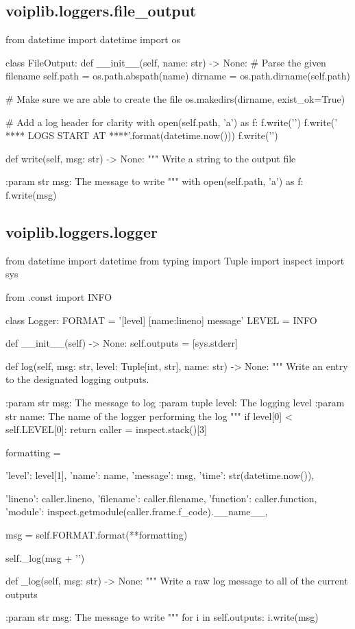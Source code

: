 \subsection{voiplib.loggers.file\_output}
\begin{pythoncode}
from datetime import datetime
import os


class FileOutput:
    def __init__(self, name: str) -> None:
        # Parse the given filename
        self.path = os.path.abspath(name)
        dirname = os.path.dirname(self.path)

        # Make sure we are able to create the file
        os.makedirs(dirname, exist_ok=True)

        # Add a log header for clarity
        with open(self.path, 'a') as f:
            f.write('\n')
            f.write('  **** LOGS START AT {} ****\n'.format(datetime.now()))
            f.write('\n')

    def write(self, msg: str) -> None:
        """
        Write a string to the output file

        :param str msg: The message to write
        """
        with open(self.path, 'a') as f:
            f.write(msg)
\end{pythoncode}
\subsection{voiplib.loggers.logger}
\begin{pythoncode}
from datetime import datetime
from typing import Tuple
import inspect
import sys

from .const import INFO


class Logger:
    FORMAT = '[{level}] [{name}:{lineno}] {message}'
    LEVEL = INFO

    def __init__(self) -> None:
        self.outputs = [sys.stderr]

    def log(self, msg: str, level: Tuple[int, str], name: str) -> None:
        """
        Write an entry to the designated logging outputs.

        :param str msg: The message to log
        :param tuple level: The logging level
        :param str name: The name of the logger performing the log
        """
        if level[0] < self.LEVEL[0]:
            return
        caller = inspect.stack()[3]

        formatting = {
            'level': level[1],
            'name': name,
            'message': msg,
            'time': str(datetime.now()),

            'lineno': caller.lineno,
            'filename': caller.filename,
            'function': caller.function,
            'module': inspect.getmodule(caller.frame.f_code).__name__,
        }
        msg = self.FORMAT.format(**formatting)

        self._log(msg + '\n')

    def _log(self, msg: str) -> None:
        """
        Write a raw log message to all of the current outputs

        :param str msg: The message to write
        """
        for i in self.outputs:
            i.write(msg)
\end{pythoncode}
